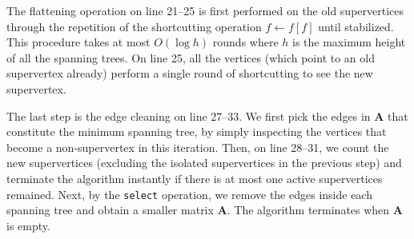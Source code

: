 \documentclass{sokendai_thesis} %
\begin{document}
The flattening operation on line 21--25 is first performed on the old supervertices through the repetition of the shortcutting operation $f\leftarrow f[f]$ until stabilized.
This procedure takes at most $O(\log h)$ rounds where $h$ is the maximum height of all the spanning trees.
On line 25, all the vertices (which point to an old supervertex already) perform a single round of shortcutting to see the new supervertex.

The last step is the edge cleaning on line 27--33.
We first pick the edges in $\mathbf{A}$ that constitute the minimum spanning tree, by simply inspecting the vertices that become a non-supervertex in this iteration.
Then, on line 28--31, we count the new supervertices (excluding the isolated supervertices in the previous step) and terminate the algorithm instantly if there is at most one active supervertices remained.
Next, by the \texttt{select} operation, we remove the edges inside each spanning tree and obtain a smaller matrix $\mathbf{A}$.
The algorithm terminates when $\mathbf{A}$ is empty.
\end{document}
